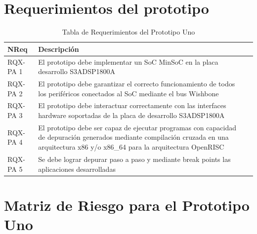 	\section{Requerimientos del prototipo}
		\begin{table}[h]
		\centering
		\begin{tabular}{ p{2.5cm} p{8cm} p{3cm} }
		\hline 
		\rowcolor[gray]{0.8} N\textordmasculine Req & Descripción\\
		\hline 
		RQX-PA 1 & El prototipo debe implementar un SoC MinSoC en la placa desarrollo S3ADSP1800A\\ 
		\hline 
		RQX-PA 2 & El prototipo debe garantizar el correcto funcionamiento de todos los periféricos conectados al SoC mediante el bus Wishbone\\ 
		\hline 
		RQX-PA 3 & El prototipo debe interactuar correctamente con las interfaces hardware soportadas de la placa de desarrollo S3ADSP1800A\\ 
		\hline
		RQX-PA 4 & El prototipo debe ser capaz de ejecutar programas con capacidad de depuración generados mediante compilación
		cruzada en una arquitectura x86 y/o x86\_64 para la arquitectura OpenRISC\\
		\hline
		RQX-PA 5 & Se debe lograr depurar paso a paso y mediante break points las aplicaciones desarrolladas\\
		\hline		
		\end{tabular}
		\caption{Tabla de Requerimientos del Prototipo Uno}
		\end{table}

\newpage
	
	\section{Matriz de Riesgo para el Prototipo Uno}

